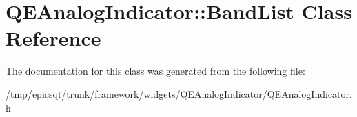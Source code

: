 \hypertarget{classQEAnalogIndicator_1_1BandList}{
\section{QEAnalogIndicator::BandList Class Reference}
\label{classQEAnalogIndicator_1_1BandList}
}


The documentation for this class was generated from the following file:\begin{DoxyCompactItemize}
\item 
/tmp/epicsqt/trunk/framework/widgets/QEAnalogIndicator/QEAnalogIndicator.h\end{DoxyCompactItemize}
